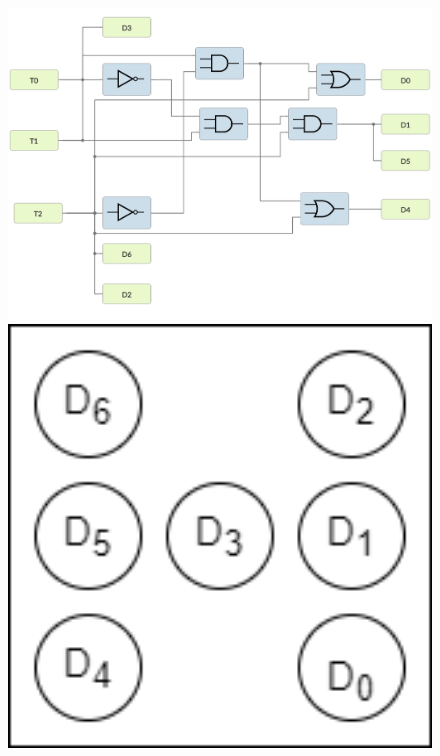 \begin{figure}[!h]
  \centering
  \begin{minipage}[c]{0.6\textwidth}
    \centering
    \includegraphics[width=1\textwidth]{Bilder/Dekoder.png} 
    \caption{}
    \label{fig:Fig5}   
  \end{minipage}
  \hfill
  \begin{minipage}[c]{0.3\textwidth}
    \centering
    \includegraphics[width=1\textwidth]{Bilder/LED_Matrix.drawio.png} 
    \caption{}
    \label{fig:Fig6}
  \end{minipage}   
\end{figure}

